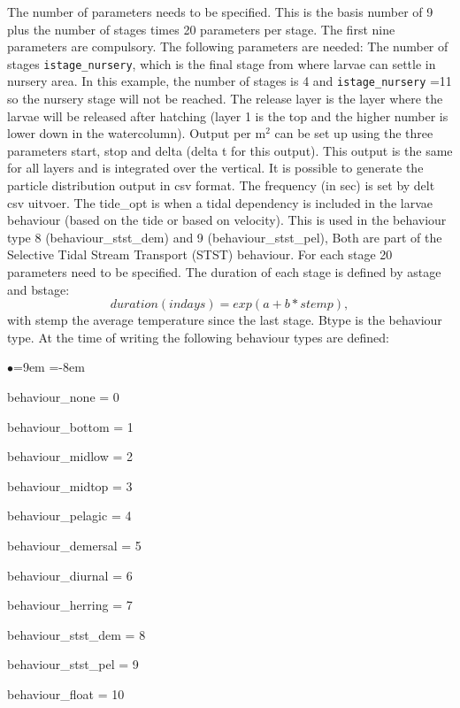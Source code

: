 \documentclass[english]{deltares_manual}
\begin{document}
The number of parameters needs to be specified. This is the basis number of 9 plus the number of stages times 20 parameters per stage. The first nine parameters are compulsory. The following parameters are needed:
The number of stages
\texttt{istage\_nursery}, which is the final stage from where larvae can settle in nursery area. In this example, the number of stages is 4 and \texttt{istage\_nursery} =11 so the nursery stage will not be reached. The release layer is the layer where the larvae will be released after hatching (layer 1 is the top and the higher number is lower down in the watercolumn). Output per m$^2$ can be set up  using the three parameters start, stop and delta (delta t for this output). This output is the same for all layers and is integrated over the vertical. 
It is possible to generate the particle distribution output in csv format.  The frequency (in sec) is set by delt csv uitvoer. 
The tide\_opt is when a tidal dependency is included in the larvae behaviour (based on the tide or based on velocity). This is used in the behaviour type 8 (behaviour\_stst\_dem) and 9 (behaviour\_stst\_pel), Both are part of the Selective Tidal Stream Transport (STST) behaviour.
For each stage 20 parameters need to be specified. The duration of each stage is defined by astage and bstage: 
\begin{equation}
duration (in days) = exp(a+b*stemp), 
\end{equation}
with stemp the average temperature since the last stage. 
Btype is the behaviour type. At the time of writing the following behaviour types are defined:
\begin{list}{$\bullet$}{\leftmargin=9em \itemindent=-8em}
	\item	behaviour\_none     	= 0 
	\item	behaviour\_bottom   	= 1 
	\item	behaviour\_midlow   	= 2 
	\item	behaviour\_midtop   	= 3 
	\item	behaviour\_pelagic  	= 4 
	\item	behaviour\_demersal 	= 5 
	\item	behaviour\_diurnal  	= 6 
	\item	behaviour\_herring  	= 7 
	\item	behaviour\_stst\_dem 	= 8 
	\item	behaviour\_stst\_pel 	= 9 
	\item	behaviour\_float    	= 10 
\end{list}
\end{document}
